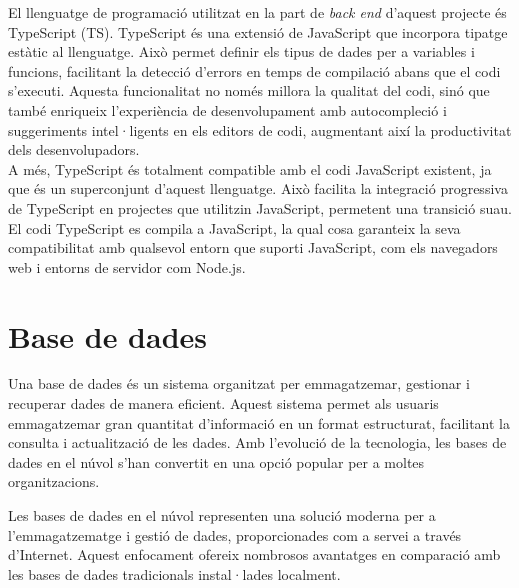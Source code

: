 \documentclass[a4paper,12pt,twoside]{ThesisStyle}
\begin{document}
El llenguatge de programació utilitzat en la part de \textit{back end} d'aquest projecte és TypeScript (TS). TypeScript és una extensió de JavaScript que incorpora tipatge estàtic al llenguatge. Això permet definir els tipus de dades per a variables i funcions, facilitant la detecció d'errors en temps de compilació abans que el codi s'executi. Aquesta funcionalitat no només millora la qualitat del codi, sinó que també enriqueix l'experiència de desenvolupament amb autocompleció i suggeriments intel·ligents en els editors de codi, augmentant així la productivitat dels desenvolupadors.\\

A més, TypeScript és totalment compatible amb el codi JavaScript existent, ja que és un superconjunt d'aquest llenguatge. Això facilita la integració progressiva de TypeScript en projectes que utilitzin JavaScript, permetent una transició suau. El codi TypeScript es compila a JavaScript, la qual cosa garanteix la seva compatibilitat amb qualsevol entorn que suporti JavaScript, com els navegadors web i entorns de servidor com Node.js.



\section{Base de dades}
\label{subsec: Base de dades}

Una base de dades és un sistema organitzat per emmagatzemar, gestionar i recuperar dades de manera eficient. Aquest sistema permet als usuaris emmagatzemar gran quantitat d'informació en un format estructurat, facilitant la consulta i actualització de les dades. Amb l'evolució de la tecnologia, les bases de dades en el núvol s'han convertit en una opció popular per a moltes organitzacions. 

Les bases de dades en el núvol representen una solució moderna per a l'emmagatzematge i gestió de dades, proporcionades com a servei a través d'Internet. Aquest enfocament ofereix nombrosos avantatges en comparació amb les bases de dades tradicionals instal·lades localment.
\end{document}
